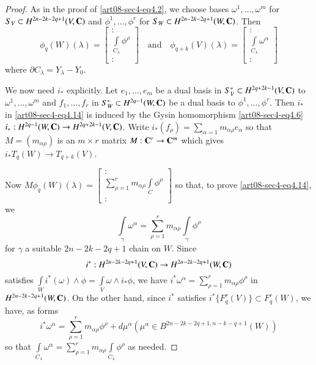 \begin{proof}
As in the proof of \eqref{art08-sec4-eq4.2}, we choose bases $\omega^{1},\ldots,\omega^{m}$ for $S_{V}\subset H^{2n-2k-2q+1}(V,\mathbf{C})$ and $\phi^{1},\ldots,\phi^{r}$ for $S_{W}\subset H^{2n-2k-2q+1}(W,\mathbf{C})$. Then
$$
\phi_{q}(W)(\lambda)=
\begin{bmatrix}
:\\
\int\limits_{C_{\lambda}}\phi^{\rho}\\
:
\end{bmatrix}
\text{~~ and~~ } \phi_{q+k}(V)(\lambda)=
\begin{bmatrix}
:\\
\int\limits_{C_{\lambda}}\omega^{\alpha}\\
:
\end{bmatrix}
$$
where $\partial C_{\lambda}=Y_{\lambda}-Y_{0}$.

We now need $i_{*}$ explicitly. Let $e_{1},\ldots,e_{m}$ be a dual basis in $S^{*}_{V}\subset H^{2q+2k-1}(V,\mathbf{C})$ to $\omega^{1},\ldots,\omega^{m}$ and $f_{1},\ldots,f_{r}$ in $S^{*}_{W}\subset H^{2q-1}(W,\mathbf{C})$ be a dual basis to $\phi^{1},\ldots,\phi^{r}$. Then $i_{*}$ in \eqref{art08-sec4-eq4.14} is induced by the Gysin homomorphism \eqref{art08-sec4-eq4.6} $i_{*}:H^{2q-1}(W,\mathbf{C})\to H^{2q+2k-1}(V,\mathbf{C})$. Write $i_{*}(f_{\rho})=\sum\limits_{\alpha=1}m_{\alpha\rho}e_{\alpha}$ so that $M=(m_{\alpha\rho})$ is an $m\times r$ matrix $M:\mathbf{C}^{r}\to \mathbf{C}^{m}$ which gives $i_{*}T_{q}(W)\to T_{q+k}(V)$.

Now $M\phi_{q}(W)(\lambda)=\left[\begin{smallmatrix}:\\ \sum\limits^{r}_{\rho=1}m_{\alpha\rho}\int\limits_{C}\phi^{\rho}\\ :\end{smallmatrix}\right]$ so that, to prove \eqref{art08-sec4-eq4.14}, we 
\begin{equation}
\int\limits_{\gamma}\omega^{\alpha}=\sum\limits^{r}_{\rho=1}m_{\alpha\rho}\int\limits_{\gamma}\phi^{\rho}\label{art08-sec4-eq4.15}
\end{equation}
for $\gamma$ a suitable $2n-2k-2q+1$ chain on $W$. Since
$$
i^{*}:H^{2n-2k-2q+1}(V,\mathbf{C})\to H^{2n-2k-2q+1}(W,\mathbf{C})
$$
satisfies $\int\limits_{W}i^{*}(\omega)\wedge \phi=\int\limits_{V}\omega \wedge i_{*}\phi$, we have $i^{*}\omega^{\alpha}=\sum\limits^{r}_{\rho=1}m_{\alpha\rho}\phi^{\rho}$ in $H^{2n-2k-2q+1}(W,\mathbf{C})$. On the other hand, since $i^{*}$ satisfies $i^{*}\{F^{r}_{q}(V)\}\subset F^{r}_{q}(W)$, we have, as forms 
$$
i^{*}\omega^{\alpha}=\sum\limits^{r}_{\rho=1}m_{\alpha\rho}\phi^{\rho}+d\mu^{\alpha}(\mu^{\alpha}\in B^{2n-2k-2q+1, n-k-q+1}(W))
$$ 
so that $\int\limits_{C_{\lambda}}\omega^{\alpha}=\sum\limits^{r}_{\rho=1}m_{\alpha\rho}\int\limits_{C_{\lambda}}\phi^{\rho}$ as needed.
\end{proof}

